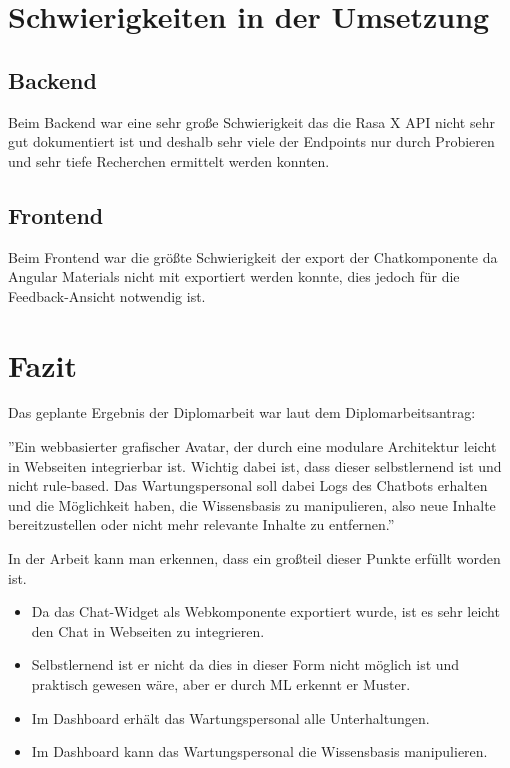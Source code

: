 \section{Schwierigkeiten in der Umsetzung}

\subsection{Backend}
Beim Backend war eine sehr große Schwierigkeit das die Rasa X API nicht sehr gut dokumentiert ist und deshalb sehr viele der Endpoints nur durch Probieren und sehr tiefe Recherchen ermittelt werden konnten.


\subsection{Frontend}
Beim Frontend war die größte Schwierigkeit der export der Chatkomponente da Angular Materials nicht mit exportiert werden konnte, dies jedoch für die Feedback-Ansicht notwendig ist.

\section{Fazit}
Das geplante Ergebnis der Diplomarbeit war laut dem Diplomarbeitsantrag:

''Ein webbasierter grafischer Avatar, der durch eine modulare Architektur leicht in Webseiten integrierbar ist.
Wichtig dabei ist, dass dieser selbstlernend ist und nicht rule-based.
Das Wartungspersonal soll dabei Logs des Chatbots erhalten und die Möglichkeit haben, die Wissensbasis zu manipulieren, also neue Inhalte bereitzustellen oder nicht mehr relevante Inhalte zu entfernen.''

In der Arbeit kann man erkennen, dass ein großteil dieser Punkte erfüllt worden ist.

\begin{itemize}
    \item Da das Chat-Widget als Webkomponente exportiert wurde, ist es sehr leicht den Chat in Webseiten zu integrieren.
    \item Selbstlernend ist er nicht da dies in dieser Form nicht möglich ist und praktisch gewesen wäre, aber er durch ML erkennt er Muster.
    \item Im Dashboard erhält das Wartungspersonal alle Unterhaltungen.
    \item Im Dashboard kann das Wartungspersonal die Wissensbasis manipulieren.
\end{itemize}

